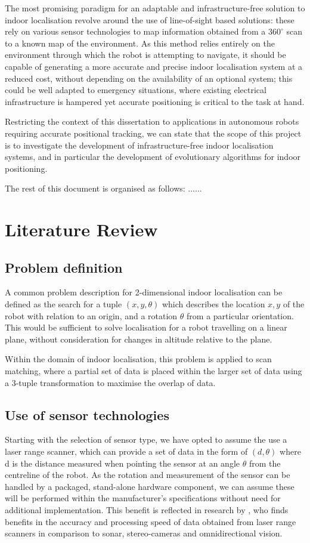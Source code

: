 \documentclass[authoryearcitations]{UoYCSproject}
\begin{document}
The most promising paradigm for an adaptable and infrastructure-free solution to indoor localisation revolve around the use of line-of-sight based solutions: these rely on various sensor technologies to map information obtained from a  $360^{\circ}$ scan to a known map of the environment. As this method relies entirely on the environment through which the robot is attempting to navigate, it should be capable of generating a more accurate and precise indoor localisation system at a reduced cost, without depending on the availability of an optional system; this could be well adapted to emergency situations, where existing electrical infrastructure is hampered yet accurate positioning is critical to the task at hand. 

Restricting the context of this dissertation to applications in autonomous robots requiring accurate positional tracking, we can state that the scope of this project is to investigate the development of infrastructure-free indoor localisation systems, and in particular the development of evolutionary algorithms for indoor positioning.

The rest of this document is organised as follows: ...... 
\chapter{Literature Review}

\section{Problem definition}
A common problem description for 2-dimensional indoor localisation can be defined as the search for a tuple $(x, y, \theta)$ which describes the location $x, y$ of the robot with relation to an origin, and a rotation $\theta$ from a particular orientation. This would be sufficient to solve localisation for a robot travelling on a linear plane, without consideration for changes in altitude relative to the plane.

Within the domain of indoor localisation, this problem is applied to scan matching, where a partial set of data is placed within the larger set of data using a 3-tuple transformation to maximise the overlap of data.


\section{Use of sensor technologies}
Starting with the selection of sensor type, we have opted to assume the use a laser range scanner, which can provide a set of data in the form of $(d, \theta)$ where d is the distance measured when pointing the sensor at an angle $\theta$ from the centreline of the robot. As the rotation and measurement of the sensor can be handled by a packaged, stand-alone hardware component, we can assume these will be performed within the manufacturer's specifications without need for additional implementation. This benefit is reflected in research by \citet{Lingemann2005-hm}, who finds benefits in the accuracy and processing speed of data obtained from laser range scanners in comparison to sonar, stereo-cameras and omnidirectional vision.
\end{document}
